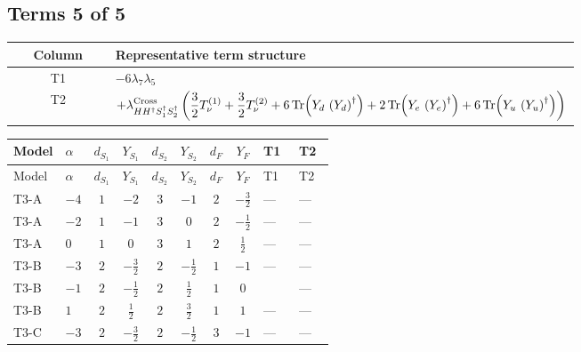 \documentclass[8pt]{article}
\begin{document}
\begin{landscape}
\subsection*{Terms 5 of 5}
\begin{center}
\begin{tabular}{@{}c >{\raggedright\arraybackslash}p{0.82\linewidth}@{}}
\toprule
Column & Representative term structure \\
\midrule
T1 & \(\displaystyle -6 {\lambda_{7}} {\lambda_5}\) \\
\midrule
T2 & \(\displaystyle +{\lambda_{H H^\dagger S_1^\dagger S_2^\dagger}^{\rm Cross}} \left(\frac{3}{2} T_{\nu}^{(1)}+\frac{3}{2} T_{\nu}^{(2)}+6 \operatorname{Tr}\!\left({Y_d}\,\left({Y_d}\right)^{\dagger}\right)+2 \operatorname{Tr}\!\left({Y_e}\,\left({Y_e}\right)^{\dagger}\right)+6 \operatorname{Tr}\!\left({Y_u}\,\left({Y_u}\right)^{\dagger}\right)\right)\) \\
\midrule
\bottomrule
\end{tabular}
\end{center}
\smallskip
\tiny
\begin{longtable}{@{}llcccccc >{\raggedright\arraybackslash}p{0.21\linewidth} >{\raggedright\arraybackslash}p{0.21\linewidth}@{}}
\toprule
Model & $\alpha$ & $d_{S_1}$ & $Y_{S_1}$ & $d_{S_2}$ & $Y_{S_2}$ & $d_F$ & $Y_F$ & T1 & T2 \\
\midrule
\endfirsthead
\toprule
Model & $\alpha$ & $d_{S_1}$ & $Y_{S_1}$ & $d_{S_2}$ & $Y_{S_2}$ & $d_F$ & $Y_F$ & T1 & T2 \\
\midrule
\endhead
T3-A & $-4$ & $1$ & $-2$ & $3$ & $-1$ & $2$ & $-\frac{3}{2}$ & --- & --- \\
\midrule
T3-A & $-2$ & $1$ & $-1$ & $3$ & $0$ & $2$ & $-\frac{1}{2}$ & --- & --- \\
\midrule
T3-A & $0$ & $1$ & $0$ & $3$ & $1$ & $2$ & $\frac{1}{2}$ & --- & --- \\
\midrule
T3-B & $-3$ & $2$ & $-\frac{3}{2}$ & $2$ & $-\frac{1}{2}$ & $1$ & $-1$ & --- & --- \\
\midrule
T3-B & $-1$ & $2$ & $-\frac{1}{2}$ & $2$ & $\frac{1}{2}$ & $1$ & $0$ & \scriptsize\adjustbox{max width=\linewidth}{$\begin{gathered} -6 {\lambda_{7}} {\lambda_5}\end{gathered}$} & --- \\
\midrule
T3-B & $1$ & $2$ & $\frac{1}{2}$ & $2$ & $\frac{3}{2}$ & $1$ & $1$ & --- & --- \\
\midrule
T3-C & $-3$ & $2$ & $-\frac{3}{2}$ & $2$ & $-\frac{1}{2}$ & $3$ & $-1$ & --- & --- \\

\end{longtable}
\end{landscape}
\end{document}

